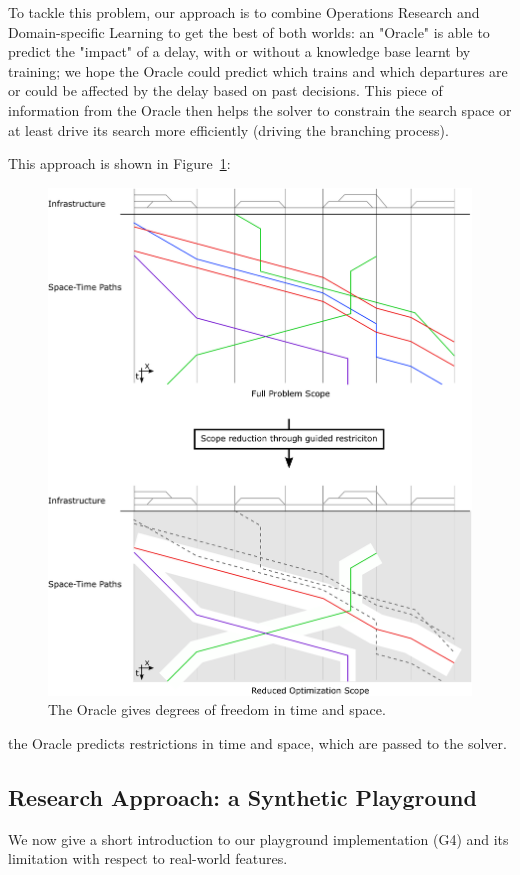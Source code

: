 \documentclass{article}
\begin{document}
To tackle this problem, our approach is to combine Operations Research and Domain-specific Learning to get the best of both worlds: an "Oracle" is able to predict the "impact" of a delay, with or without a knowledge base learnt by training; we hope the Oracle could predict which trains and which departures are or could be affected by the delay based on past decisions. This piece of information from the Oracle then helps the solver to constrain the search space or at least drive its search more efficiently (driving the branching process).

This approach is shown in Figure~\ref{fig:introduction_time_space}:
%
\begin{figure}[hbtp]
	\centering
  \includegraphics[width=\textwidth]{Figures/rsp_rescheduling_rsp.pdf}
	\caption{The Oracle gives degrees of freedom in time and space.}
	\label{fig:introduction_time_space}
\end{figure}
the Oracle predicts restrictions in time and space, which are passed to the solver.

\subsection{Research Approach: a Synthetic Playground}\label{subsec:playground}
We now give a short introduction to our playground implementation (G4) and its limitation with respect to real-world features.
\end{document}
